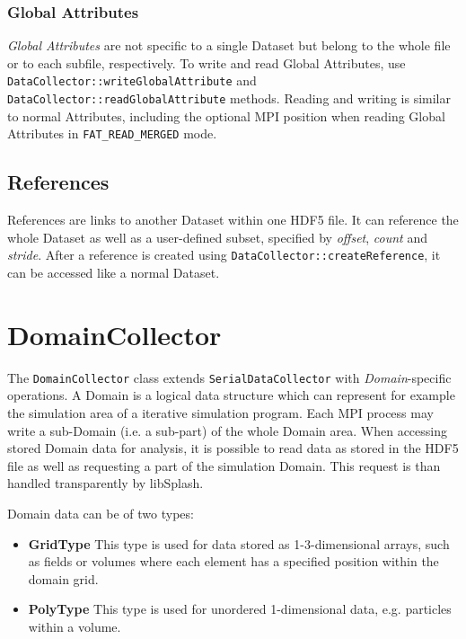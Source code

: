 \documentclass[a4paper,10pt,BCOR12mm]{report}
\begin{document}
\subsection{Global Attributes}

\emph{Global Attributes} are not specific to a single Dataset but belong to the whole
file or to each subfile, respectively.
To write and read Global Attributes, use\\ \texttt{DataCollector::writeGlobalAttribute} and\\
\texttt{DataCollector::readGlobalAttribute} methods.
Reading and writing is similar to normal Attributes, including the optional MPI position
when reading Global Attributes in \texttt{FAT\_READ\_MERGED} mode.


\section{References}

References are links to another Dataset within one HDF5 file.
It can reference the whole Dataset as well as a user-defined subset, specified
by \emph{offset}, \emph{count} and \emph{stride}.
After a reference is created using \texttt{DataCollector::createReference},
it can be accessed like a normal Dataset.


\chapter{DomainCollector}

The \texttt{DomainCollector} class extends \texttt{SerialDataCollector} with \emph{Domain}-specific operations.
A Domain is a logical data structure which can represent for example the simulation area of a iterative simulation program.
Each MPI process may write a sub-Domain (i.e. a sub-part) of the whole Domain area.
When accessing stored Domain data for analysis, it is possible to read data as stored in the HDF5 file as well as requesting
a part of the simulation Domain. This request is than handled transparently by libSplash.

Domain data can be of two types:
\begin{itemize}
	\item \textbf{GridType}
	This type is used for data stored as 1-3-dimensional arrays, such as fields or volumes where each element has a specified position within the domain grid.

	\item \textbf{PolyType}
	This type is used for unordered 1-dimensional data, e.g. particles within a volume.
\end{itemize}
\end{document}
